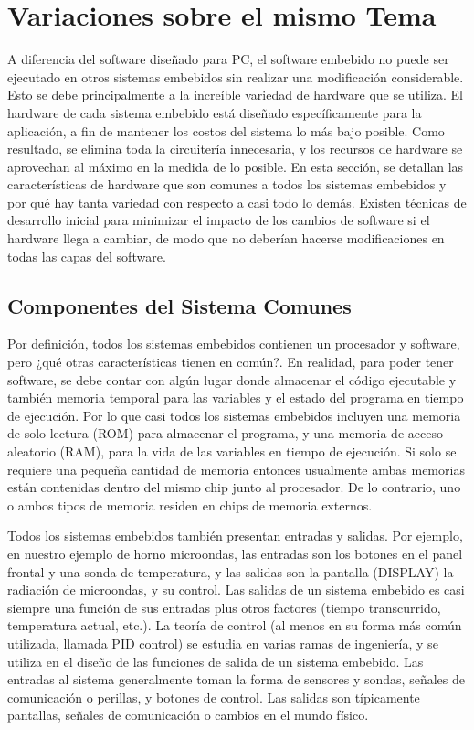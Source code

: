 \documentclass[output=paper, 
colorlinks,
citecolor=brown,
newtxmath
]{langscibook}
\begin{document}
\section {Variaciones sobre el mismo Tema}


A diferencia del software diseñado para PC, el software embebido no puede ser ejecutado
en otros sistemas embebidos sin realizar una modificación considerable. Esto se debe 
principalmente a la increíble variedad de hardware que se utiliza.
El hardware de cada sistema embebido está diseñado específicamente para la aplicación, 
a fin de mantener los costos del sistema lo más bajo posible. Como resultado, 
se elimina toda la circuitería innecesaria, y los recursos de hardware se 
aprovechan al máximo en la medida de lo posible.
En esta sección, se detallan las características de hardware que son comunes 
a todos los sistemas embebidos y por qué hay tanta variedad con respecto a casi 
todo lo demás. Existen técnicas de desarrollo inicial para minimizar el impacto de 
los cambios de software si el hardware llega a cambiar, de modo que no deberían
hacerse modificaciones en todas las capas del software.



\subsection {Componentes del Sistema Comunes}


Por definición, todos los sistemas embebidos contienen un procesador y software, 
pero ¿qué otras características tienen en común?. En realidad, para poder tener software, 
se debe contar con algún lugar donde almacenar el código ejecutable y también
memoria temporal para las variables y el estado del programa en tiempo de ejecución. 
Por lo que casi todos los sistemas embebidos incluyen una memoria de solo lectura (ROM) 
para almacenar el programa, y una memoria de acceso aleatorio (RAM), para la vida
de las variables en tiempo de ejecución. Si solo se requiere una pequeña cantidad 
de memoria entonces usualmente ambas memorias están contenidas dentro del mismo chip junto al
procesador.
De lo contrario, uno o ambos tipos de memoria residen en chips de memoria externos.

Todos los sistemas embebidos también presentan entradas y salidas. Por ejemplo, 
en nuestro ejemplo de horno microondas, las entradas son los botones en el panel 
frontal y una sonda de temperatura, y las salidas son la pantalla (DISPLAY) 
la radiación de microondas, y su control. Las salidas de un sistema embebido es 
casi siempre una función de sus entradas plus otros factores (tiempo transcurrido, 
temperatura actual, etc.). La teoría de control (al menos en su forma
más común utilizada, llamada PID control)
se estudia en varias ramas de ingeniería, y se utiliza en el diseño de las 
funciones de salida de un sistema embebido. Las entradas al sistema generalmente toman 
la forma de sensores y sondas, señales de comunicación o perillas, y botones de control. 
Las salidas son típicamente pantallas, señales de comunicación o cambios en el mundo físico.
\end{document}
